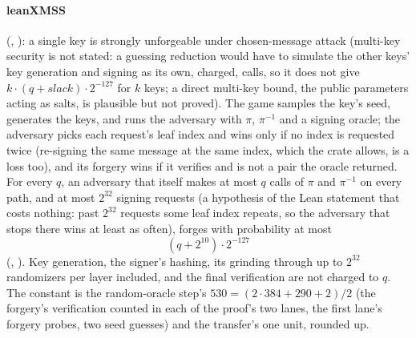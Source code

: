 \documentclass[11pt]{article}
\begin{document}
\paragraph{leanXMSS} (,
): a single key is strongly unforgeable under chosen-message attack
(multi-key security is not stated: a guessing reduction would have to simulate the other keys' key
generation and signing as its own, charged, calls, so it does not give $k\cdot(q+\mathit{slack})\cdot2^{-127}$ for
$k$ keys; a direct multi-key bound, the public parameters acting as salts, is plausible but not proved).
The game samples the key's seed, generates the keys, and runs the adversary with $\pi$,
$\pi^{-1}$ and a signing oracle; the adversary picks each request's leaf index and wins
only if no index is requested twice (re-signing the same message at the same index, which the crate allows, is a loss too), and its forgery wins if it verifies and is not a pair the
oracle returned. For every $q$, an adversary that itself makes at most $q$ calls of $\pi$ and
$\pi^{-1}$ on every path, and at most $2^{32}$ signing requests (a hypothesis of the Lean statement that costs nothing: past $2^{32}$ requests some leaf index repeats, so the adversary that stops there wins at least as often),
forges with probability at most
\[
\boxed{\ (q + 2^{10})\cdot 2^{-127}\ }
\]
(, ). Key
generation, the signer's hashing, its grinding through up to $2^{32}$ randomizers per layer
included, and the final verification are not charged to $q$. The constant is the random-oracle
step's $530 = (2\cdot384 + 290 + 2)/2$ (the forgery's verification counted in each of the proof's two
lanes, the first lane's forgery probes, two seed guesses) and the transfer's one unit, rounded up.
\end{document}
